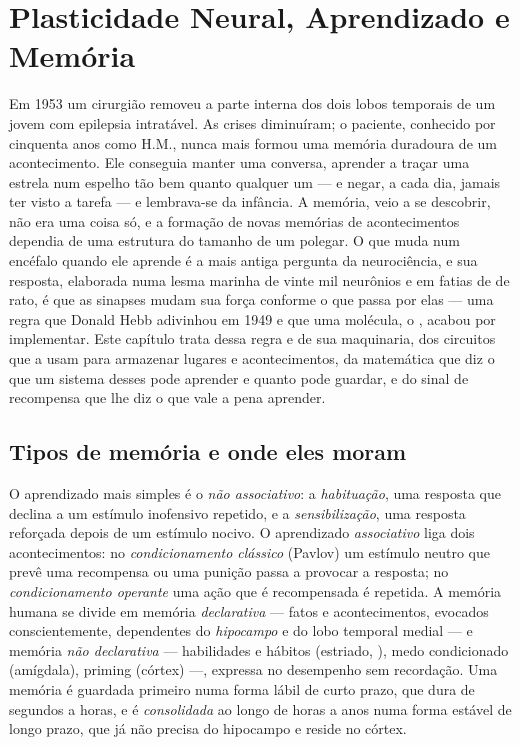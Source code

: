 \chapter{Plasticidade Neural, Aprendizado e Memória}\label{ch:b3:learning-memory}

Em 1953 um cirurgião removeu a parte interna dos dois lobos temporais de
um jovem com epilepsia intratável. As crises diminuíram; o paciente,
conhecido por cinquenta anos como H.M., nunca mais formou uma memória
duradoura de um acontecimento. Ele conseguia manter uma conversa,
aprender a traçar uma estrela num espelho tão bem quanto qualquer um ---
e negar, a cada dia, jamais ter visto a tarefa --- e lembrava-se da
infância. A memória, veio a se descobrir, não era uma coisa só, e a
formação de novas memórias de acontecimentos dependia de uma estrutura
do tamanho de um polegar. O que muda num encéfalo quando ele aprende é a
mais antiga pergunta da neurociência, e sua resposta, elaborada numa
lesma marinha de vinte mil neurônios e em fatias de  de rato, é
que as sinapses mudam sua força conforme o que passa por elas --- uma
regra que Donald Hebb adivinhou em 1949 e que uma molécula, o , acabou por implementar. Este capítulo trata dessa regra e de sua
maquinaria, dos circuitos que a usam para armazenar lugares e
acontecimentos, da matemática que diz o que um sistema desses pode
aprender e quanto pode guardar, e do sinal de recompensa que lhe diz o
que vale a pena aprender.

\section{Tipos de memória e onde eles moram}

\begin{definition}\label{def:b3:learning-memory:kinds}
O aprendizado mais simples é o \emph{não associativo}: a
\emph{habituação}, uma resposta que declina a um estímulo inofensivo
repetido, e a \emph{sensibilização}, uma resposta reforçada depois de um
estímulo nocivo. O aprendizado \emph{associativo} liga dois
acontecimentos: no \emph{condicionamento clássico} (Pavlov) um estímulo
neutro que prevê uma recompensa ou uma punição passa a provocar a
resposta; no \emph{condicionamento operante} uma ação que é recompensada
é repetida. A memória humana se divide em memória \emph{declarativa}
--- fatos e acontecimentos, evocados conscientemente, dependentes do
\emph{hipocampo} e do lobo temporal medial --- e memória \emph{não
declarativa} --- habilidades e hábitos (estriado, ), medo
condicionado (amígdala), priming (córtex) ---, expressa no desempenho
sem recordação. Uma memória é guardada primeiro numa forma lábil de
curto prazo, que dura de segundos a horas, e é \emph{consolidada} ao
longo de horas a anos numa forma estável de longo prazo, que já não
precisa do hipocampo e reside no córtex.
\end{definition}

